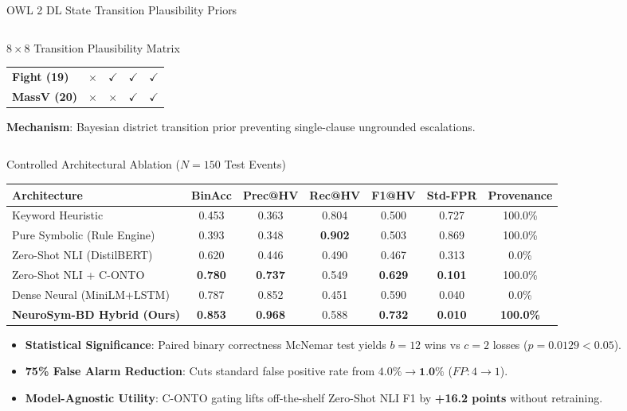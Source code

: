 \documentclass[aspectratio=169, 10pt]{beamer}
\begin{document}
\begin{frame}{OWL 2 DL State Transition Plausibility Priors}
\begin{columns}[T]
\begin{column}{0.44\textwidth}
\begin{block}{$8 \times 8$ Transition Plausibility Matrix}
\begin{tabular}{lcccc}
          \textbf{Fight (19)}    & $\times$     & $\checkmark$ & $\checkmark$ & $\checkmark$ \\
          \textbf{MassV (20)}    & $\times$     & $\times$     & $\checkmark$ & $\checkmark$ \\
          \bottomrule
        \end{tabular}
      \end{block}
      \vspace{0.3em}
      \footnotesize
      \textbf{Mechanism}: Bayesian district transition prior preventing single-clause ungrounded escalations.
    \end{column}
  \end{columns}
\end{frame}

\begin{frame}{Controlled Architectural Ablation ($N=150$ Test Events)}
  \begin{table}[h]
    \centering
    \small
    \begin{tabular}{lcccccc}
      \toprule
      \textbf{Architecture} & \textbf{BinAcc} & \textbf{Prec@HV} & \textbf{Rec@HV} & \textbf{F1@HV} & \textbf{Std-FPR} & \textbf{Provenance} \\
      \midrule
      Keyword Heuristic & 0.453 & 0.363 & 0.804 & 0.500 & 0.727 & 100.0\% \\
      Pure Symbolic (Rule Engine) & 0.393 & 0.348 & \textbf{0.902} & 0.503 & 0.869 & 100.0\% \\
      Zero-Shot NLI (DistilBERT) & 0.620 & 0.446 & 0.490 & 0.467 & 0.313 & 0.0\% \\
      Zero-Shot NLI + C-ONTO & \textbf{0.780} & \textbf{0.737} & 0.549 & \textbf{0.629} & \textbf{0.101} & 100.0\% \\
      Dense Neural (MiniLM+LSTM) & 0.787 & 0.852 & 0.451 & 0.590 & 0.040 & 0.0\% \\
      \rowcolor{EmeraldGreen!15}
      \textbf{NeuroSym-BD Hybrid (Ours)} & \textbf{0.853} & \textbf{0.968} & 0.588 & \textbf{0.732} & \textbf{0.010} & \textbf{100.0\%} \\
      \bottomrule
    \end{tabular}
  \end{table}
  \vspace{0.4em}
  \begin{itemize}
    \item \textbf{Statistical Significance}: Paired binary correctness McNemar test yields $b=12$ wins vs $c=2$ losses (\textbf{$p = 0.0129 < 0.05$}).
    \item \textbf{75\% False Alarm Reduction}: Cuts standard false positive rate from $4.0\% \to \textbf{1.0\%}$ ($FP: 4 \to 1$).
    \item \textbf{Model-Agnostic Utility}: C-ONTO gating lifts off-the-shelf Zero-Shot NLI F1 by \textbf{+16.2 points} without retraining.
  \end{itemize}
\end{frame}
\end{document}
